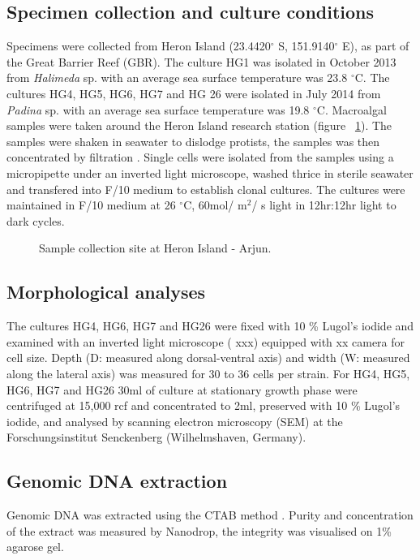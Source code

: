 \documentclass[12pt]{article}
\begin{document}
\subsection{Specimen collection and culture conditions}
Specimens were collected from Heron Island (23.4420$^{\circ}$ S, 151.9140$^{\circ}$ E), as part of the Great Barrier Reef (GBR). 
The culture HG1 was isolated in October 2013 from \emph{Halimeda} sp. with an average sea surface temperature was 23.8 $^{\circ}$C. 
The cultures HG4, HG5, HG6, HG7 and HG 26 were isolated in July 2014 from \emph{Padina} sp. with an average sea surface temperature was 19.8 $^{\circ}$C.
Macroalgal samples were taken around the Heron Island research station (figure ~\ref{fig:HeronMap}). The samples were shaken in seawater to dislodge protists, the samples was then concentrated by filtration \cite{litaker2010global}. Single cells were isolated from the samples using a micropipette under an inverted light microscope, washed thrice in sterile seawater and transfered into F/10 medium \cite{holmes1991strain} to establish clonal cultures.
The cultures were maintained in F/10 medium at 26 $^{\circ}$C, 60mol/ m$^{2}$/ s light in 12hr:12hr light to dark cycles.

\FloatBarrier 
\begin{figure} 
\caption{Sample collection site at Heron Island - Arjun.} 
\label{fig:HeronMap}
\end{figure} 
\FloatBarrier 



\subsection{Morphological analyses}
The cultures HG4, HG6, HG7 and HG26 were fixed with 10 \% Lugol's iodide and examined with an inverted light microscope ( xxx) equipped with xx camera for cell size. Depth (D: measured along dorsal-ventral axis) and width (W: measured along the lateral axis) was measured for 30 to 36 cells per strain.
For HG4, HG5, HG6, HG7 and HG26 30ml of culture at stationary growth phase were centrifuged at 15,000 rcf and concentrated to 2ml, preserved with 10 \% Lugol's iodide, and analysed by scanning electron microscopy (SEM) at the Forschungsinstitut Senckenberg (Wilhelmshaven, Germany).  

\subsection{Genomic DNA extraction}
Genomic DNA was extracted using the CTAB method \cite{zhou1999analysis}. Purity and concentration of the extract was measured by Nanodrop, the integrity was visualised on 1\% agarose gel.
\end{document}
